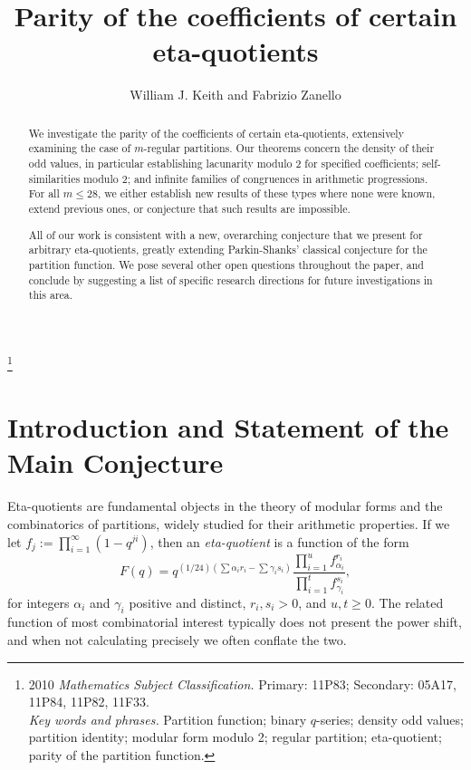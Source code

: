\documentclass[12pt]{amsart}
\theoremstyle{definition}
\begin{document}
\title[Parity of the coefficients of certain eta-quotients]{Parity of the coefficients of certain eta-quotients}
\author{William J. Keith and Fabrizio Zanello} \address{Department of Mathematical Sciences\\ Michigan Tech\\ Houghton, MI  49931-1295}
%
\thanks{2010 {\em Mathematics Subject Classification.} Primary: 11P83; Secondary:  05A17, 11P84, 11P82, 11F33.\\\indent 
{\em Key words and phrases.} Partition function; binary $q$-series; density odd values; partition identity; modular form modulo 2; regular partition; eta-quotient; parity of the partition function.}

\maketitle

\begin{abstract} We investigate the parity of the coefficients of certain eta-quotients, extensively examining the case of $m$-regular partitions. Our theorems concern the density of their odd values, in particular establishing lacunarity modulo 2 for specified coefficients; self-similarities modulo 2; and infinite families of congruences in arithmetic progressions.  For all $m \leq 28$, we either establish new results of these types where none were known, extend previous ones, or conjecture that such results are impossible.

All of our work is consistent with a new, overarching conjecture that we present for arbitrary eta-quotients, greatly extending Parkin-Shanks' classical conjecture for the partition function.  We pose several other open questions throughout the paper, and conclude by suggesting a list of specific research directions for future investigations in this area.
\end{abstract}

\section{Introduction and Statement of the Main Conjecture}

Eta-quotients are fundamental objects in the theory of modular forms and the combinatorics of partitions, widely studied for their arithmetic properties.  If we let $f_j := \prod_{i=1}^\infty (1-q^{ji})$, then an \emph{eta-quotient} is a function of the form
\begin{equation}\label{eta}
F(q)=q^{(1/24) (\sum \alpha_i r_i - \sum \gamma_i s_i)}\frac{\prod_{i=1}^uf_{\alpha_i}^{r_i}}{\prod_{i=1}^tf_{\gamma_i}^{s_i}},
\end{equation}
for integers $\alpha_i$ and $\gamma_i$ positive and distinct, $r_i, s_i > 0$, and $u,t\ge 0$.  The related function of most combinatorial interest typically does not present the power shift, and when not calculating precisely we often conflate the two.
\end{document}
